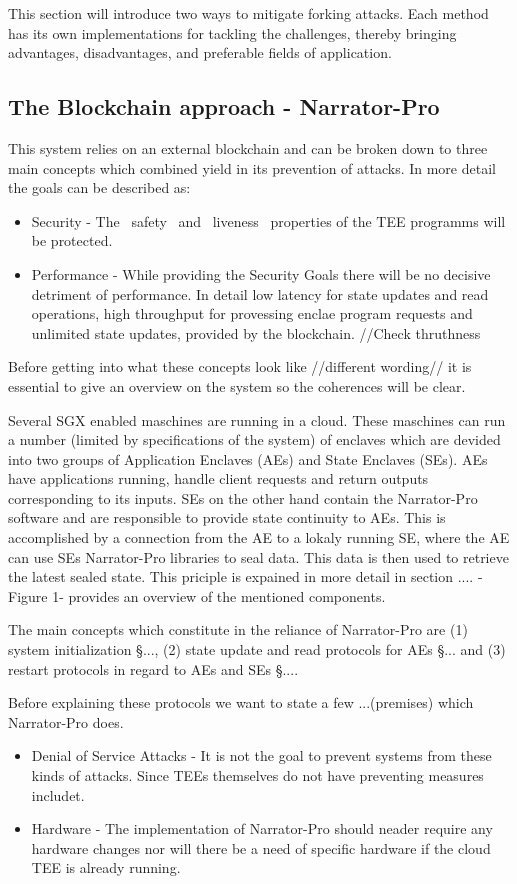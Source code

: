 This section will introduce two ways to mitigate forking attacks. Each method has its own implementations for tackling the challenges, thereby bringing advantages, disadvantages, and preferable fields of application.

\subsection{The Blockchain approach - Narrator-Pro}

This system relies on an external blockchain and can be broken down to three main concepts which combined yield in its prevention of attacks. In more detail the goals can be described as:
\begin{itemize}
    \item Security - The ~safety~ and ~liveness~ properties of the TEE programms will be protected.
    \item Performance -  While providing the Security Goals there will be no decisive detriment of performance. In detail low latency for state updates and read operations, high throughput for provessing enclae program requests and unlimited state updates, provided by the blockchain. //Check thruthness
\end{itemize} 
Before getting into what these concepts look like //different wording// it is essential to give an overview on the system so the coherences will be clear.

Several SGX enabled maschines are running in a cloud. These maschines can run a number (limited by specifications of the system) of enclaves which are devided into two groups of Application Enclaves (AEs) and State Enclaves (SEs). AEs have applications running, handle client requests and return outputs corresponding to its inputs. SEs on the other hand contain the Narrator-Pro software and are responsible to provide state continuity to AEs. This is accomplished by a connection from the AE to a lokaly running SE, where the AE can use SEs Narrator-Pro libraries to seal data. This data is then used to retrieve the latest sealed state. This priciple is expained in more detail in section .... -Figure 1- provides an overview of the mentioned components.

The main concepts which constitute in the reliance of Narrator-Pro are (1) system initialization §..., (2) state update and read protocols for AEs §... and (3) restart protocols in regard to AEs and SEs §....

Before explaining these protocols we want to state a few ...(premises) which Narrator-Pro does. 
\begin{itemize}
    \item Denial of Service Attacks - It is not the goal to prevent systems from these kinds of attacks. Since TEEs themselves do not have preventing measures includet. 
    \item Hardware - The implementation of Narrator-Pro should neader require any hardware changes nor will there be a need of specific hardware if the cloud TEE is already running. 
\end{itemize} 